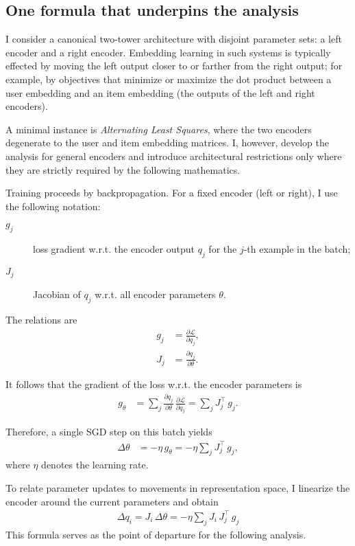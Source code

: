 \subsection{One formula that underpins the analysis}

I consider a canonical two-tower architecture with disjoint parameter sets: a left encoder and a right encoder. Embedding learning in such systems is typically effected by moving the left output closer to or farther from the right output; for example, by objectives that minimize or maximize the dot product between a user embedding and an item embedding (the outputs of the left and right encoders).

A minimal instance is \emph{Alternating Least Squares}, where the two encoders degenerate to the user and item embedding matrices. I, however, develop the analysis for general encoders and introduce architectural restrictions only where they are strictly required by the following mathematics.

Training proceeds by backpropagation. For a fixed encoder (left or right), I use the following notation:

\begin{description}
\item[$g_j$] loss gradient w.r.t. the encoder output $q_j$ for the $j$-th example in the batch;
\item[$J_j$] Jacobian of $q_j$ w.r.t. all encoder parameters $\theta$.
\end{description}

The relations are
\begin{align}
g_j &= \frac{\partial \mathcal{L}}{\partial q_j}, \tag{1}\\
J_j &= \frac{\partial q_j}{\partial \theta}. \tag{2}
\end{align}

It follows that the gradient of the loss w.r.t. the encoder parameters is
\begin{align}
g_{\theta} &= \sum_{j} \frac{\partial q_j}{\partial \theta}\, \frac{\partial \mathcal{L}}{\partial q_j}
= \sum_{j} J_{j}^{\!\top}\, g_{j}. \tag{3}
\end{align}

Therefore, a single SGD step on this batch yields
\begin{align}
\Delta \theta &= -\eta\,g_{\theta}
= -\eta \sum_{j} J_{j}^{\!\top}\, g_{j}, \tag{4}
\end{align}
where $\eta$ denotes the learning rate.

To relate parameter updates to movements in representation space, I linearize the encoder around the current parameters and obtain
\begin{align}
\boxed{\; \Delta q_{i} = J_{i}\,\Delta\theta = -\eta \sum_{j} J_{i}\,J_{j}^{\!\top}\,g_{j} \;} \tag{5}
\end{align}
This formula serves as the point of departure for the following analysis.
